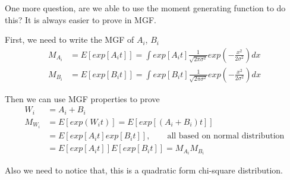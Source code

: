 One more question, are we able to use the moment generating function to do this? It is always easier to prove in MGF.

First, we need to write the MGF of $A_i$, $B_i$
\begin{align*}
	M_{A_i} & =E[exp[A_i t]] = \int exp[A_i t] \frac{1}{\sqrt{2 \pi \sigma^2}} exp(-\frac{x^2}{2 \sigma^2}) dx\\
	M_{B_i} & =E[exp[B_i t]] = \int exp[B_i t] \frac{1}{\sqrt{2 \pi \sigma^2}} exp(-\frac{x^2}{2 \sigma^2}) dx
\end{align*} 

Then we can use MGF properties to prove
\begin{align*}
	W_i & = A_i + B_i\\
	M_{W_i} &= E[exp(W_i t)] = E[exp[(A_i + B_i) t]] \\
	&= E[exp[A_i t] exp[B_i t]], \qquad \text{all based on normal distribution} \\
	&= E[exp[A_i t]] E[exp[B_i t]] = M_{A_i} M_{B_i}
\end{align*} 

Also we need to notice that, this is a quadratic form chi-square distribution.

